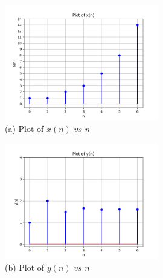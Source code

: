 \documentclass[journal,12pt,twocolumn]{IEEEtran}
\theoremstyle{remark}
\begin{document}
	
	\begin{figure}[htbp]
		\centering
		\includegraphics[width=0.6\textwidth]{ncert-maths/11/9/1/14/figures/fig1.png}
		\caption*{\hspace{2cm} (a) Plot of $x(n)$ $vs$ $n$}
	\end{figure}
	
	\begin{figure}[htbp]
		\centering
		\includegraphics[width=0.6\textwidth]{ncert-maths/11/9/1/14/figures/fig2.png}
		\caption*{\hspace{2cm} (b) Plot of $y(n)$ $vs$ $n$}
		
	\end{figure}
	
	
\end{document}
